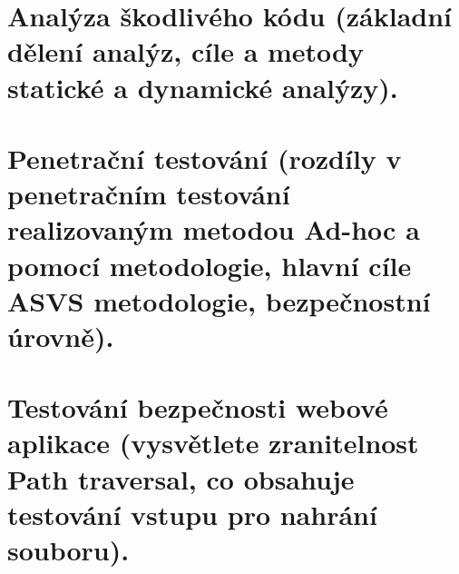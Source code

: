 \clearpage
\section{Analýza škodlivého kódu (základní dělení analýz, cíle a metody statické a dynamické analýzy).}



\clearpage
\section{Penetrační testování (rozdíly v penetračním testování realizovaným metodou Ad-hoc a pomocí metodologie, hlavní cíle ASVS metodologie, bezpečnostní úrovně).}



\clearpage
\section{Testování bezpečnosti webové aplikace (vysvětlete zranitelnost Path traversal, co obsahuje testování vstupu pro nahrání souboru).}



